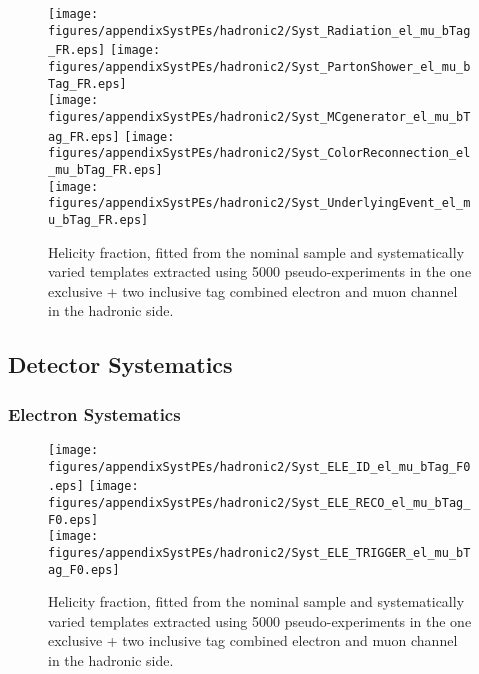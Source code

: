 \begin{figure}[!hb]
\begin{center}
        \texttt{[image: figures/appendixSystPEs/hadronic2/Syst\_Radiation\_el\_mu\_bTag\_FR.eps]}
        \texttt{[image: figures/appendixSystPEs/hadronic2/Syst\_PartonShower\_el\_mu\_bTag\_FR.eps]}\\
        \texttt{[image: figures/appendixSystPEs/hadronic2/Syst\_MCgenerator\_el\_mu\_bTag\_FR.eps]}
        \texttt{[image: figures/appendixSystPEs/hadronic2/Syst\_ColorReconnection\_el\_mu\_bTag\_FR.eps]}\\
        \texttt{[image: figures/appendixSystPEs/hadronic2/Syst\_UnderlyingEvent\_el\_mu\_bTag\_FR.eps]}
        
\caption{Helicity fraction, \fr fitted from the nominal \ttbar sample and systematically varied templates extracted using 5000 pseudo-experiments in the one exclusive + two inclusive \bt tag combined electron and muon channel in the hadronic side. }
\label{fig:systematicVar_lep_fR_elmu2incl_1}
\end{center}
\end{figure}

\subsection{Detector Systematics}
\subsubsection{Electron Systematics}
\begin{figure}[!hb]
\begin{center}
        \texttt{[image: figures/appendixSystPEs/hadronic2/Syst\_ELE\_ID\_el\_mu\_bTag\_F0.eps]}
        \texttt{[image: figures/appendixSystPEs/hadronic2/Syst\_ELE\_RECO\_el\_mu\_bTag\_F0.eps]}\\
        \texttt{[image: figures/appendixSystPEs/hadronic2/Syst\_ELE\_TRIGGER\_el\_mu\_bTag\_F0.eps]}
\caption{Helicity fraction, \fo fitted from the nominal \ttbar sample and systematically varied templates extracted using 5000 pseudo-experiments in the one exclusive + two inclusive \bt tag combined electron and muon channel in the hadronic side. }
\label{fig:systematicVar_lep_f0_elmu2incl_ELE}
\end{center}
\end{figure}

